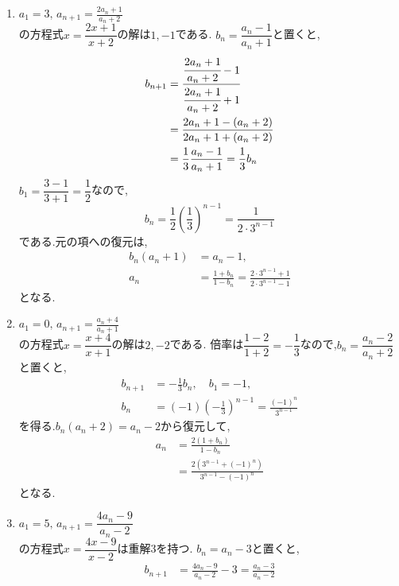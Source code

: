 \noindent{}\par\nobreak
\begin{enumerate}[label=(\arabic*),parsep=3pt,format=\bookitemlink{example-mobius-1}{solution}{problem}]
  \item $\displaystyle a_1=3,\, a_{n+1}=\frac{2a_n+1}{a_n+2}$\\
    の方程式$x=\dfrac{2x+1}{x+2}$の解は$1,-1$である.
    $b_n=\dfrac{a_n-1}{a_n+1}$と置くと,
    \begin{align*}
      b_{n+1}&=\cfrac{\cfrac{2a_n+1}{a_n+2}-1}{\cfrac{2a_n+1}{a_n+2}+1}\\
      &=\frac{2a_n+1-(a_n+2)}{2a_n+1+(a_n+2)}\\
      &=\frac13\frac{a_n-1}{a_n+1}=\frac13b_n
    \end{align*}
    $b_1=\dfrac{3-1}{3+1}=\dfrac{1}{2}$なので,
    \[
      b_n=\frac12\left(\frac13\right)^{n-1}
      =\frac1{2\cdot3^{n-1}}
    \]
    である.元の項への復元は,
    \begin{align*}
      b_n(a_n+1)&=a_n-1,\\
      a_n&=\frac{1+b_n}{1-b_n}
      =\frac{2\cdot3^{n-1}+1}{2\cdot3^{n-1}-1}
    \end{align*}
    となる.
  \item $\displaystyle a_1=0,\, a_{n+1}=\frac{a_n+4}{a_n+1}$\\
    の方程式$x=\dfrac{x+4}{x+1}$の解は$2,-2$である.
    倍率は$\dfrac{1-2}{1+2}=-\dfrac{1}{3}$なので,$b_n=\dfrac{a_n-2}{a_n+2}$と置くと,
    \begin{align*}
      b_{n+1}&=-\frac13b_n,\quad b_1=-1,\\
      b_n&=(-1)\left(-\frac13\right)^{n-1}
      =\frac{(-1)^n}{3^{n-1}}
    \end{align*}
    を得る.$b_n(a_n+2)=a_n-2$から復元して,
    \begin{align*}
      a_n&=\frac{2(1+b_n)}{1-b_n}\\
      &=\frac{2\left(3^{n-1}+(-1)^n\right)}{3^{n-1}-(-1)^n}
    \end{align*}
    となる.
  \item $\displaystyle a_1=5,\, a_{n+1}=\dfrac{4a_n-9}{a_n-2}$\\
    の方程式$x=\dfrac{4x-9}{x-2}$は重解$3$を持つ.
    $b_n=a_n-3$と置くと,
    \begin{align*}
      b_{n+1}&=\frac{4a_n-9}{a_n-2}-3
      =\frac{a_n-3}{a_n-2}\\

\end{align*}
\end{enumerate}
